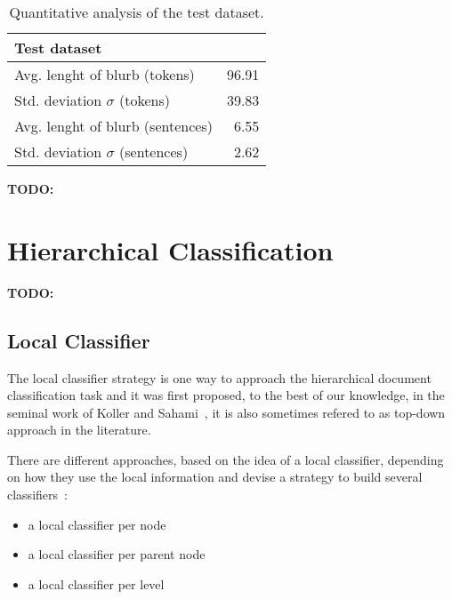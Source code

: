 \documentclass[11pt]{article}
\begin{document}
\begin{table}
\small
\begin{center}
\begin{tabular}{|l|r|}
\hline\centering\textbf{Test dataset}  &         \\
\hline
Avg. lenght of blurb (tokens)              &  96.91             \\
Std. deviation $\sigma$ (tokens)           &  39.83             \\
Avg. lenght of blurb (sentences)           &  6.55              \\
Std. deviation $\sigma$ (sentences)        &  2.62              \\
\hline
\end{tabular}
\end{center}
\caption{\label{quantitivy-analysis-test}Quantitative analysis of the test dataset.}
\end{table}




\textbf{TODO:}


\section{Hierarchical Classification}


\textbf{TODO:}

\subsection{Local Classifier}

The local classifier strategy is one way to approach the hierarchical document classification task
and it was first proposed, to the best of our knowledge, in the seminal work of Koller and
Sahami~, it is also sometimes refered to as top-down
approach in the literature.

There are different approaches, based on the idea of a local classifier, depending on how they use
the local information and devise a strategy to build several classifiers~\cite{Silla:2011:SHC:1937796.1937884}:

\begin{itemize}
\item{a local classifier per node}
\item{a local classifier per parent node}
\item{a local classifier per level}
\end{itemize}
\end{document}
